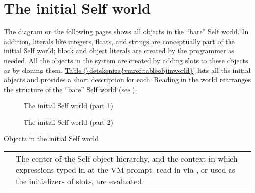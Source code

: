 \documentclass[letterpaper,10pt,english]{sphinxmanual}
\begin{document}
\newpage

\section{The initial Self world}
\label{\detokenize{vmref:the-initial-self-world}}
The diagram on the following pages shows all objects in the “bare” Self world. In addition, literals
like integers, floats, and strings are conceptually part of the initial Self world; block and object
literals are created by the programmer as needed. All the objects in the system are created by adding
slots to these objects or by cloning them. \hyperref[\detokenize{vmref:tableobjinworld}]{Table \ref{\detokenize{vmref:tableobjinworld}}} lists all the initial objects and provides a short
description for each. Reading in the world rearranges the structure of the “bare” Self world (see {\hyperref[\detokenize{selfwrld::doc}]{}}).
\begin{figure}[htbp]
\centering
\capstart

\noindent{}
\caption{The initial Self world (part 1)}\label{\detokenize{vmref:initialselfworld}}\label{\detokenize{vmref:id4}}\end{figure}
\begin{figure}[htbp]
\centering
\capstart

\noindent{}
\caption{The initial Self world (part 2)}\label{\detokenize{vmref:id5}}\end{figure}


\begin{threeparttable}
\capstart\caption{Objects in the initial Self world}\label{\detokenize{vmref:tableobjinworld}}\label{\detokenize{vmref:id6}}
\noindent\begin{tabulary}{\linewidth}{p{5cm} p{10cm}}
\hline
{}\relax &\relax \\
\hline
{}
&
The center of the Self object hierarchy, and the context in which expressions typed in at the VM prompt, read in via , or used as the initializers of slots, are evaluated.
\\
\hline\end{tabulary}

\end{threeparttable}
\end{document}
